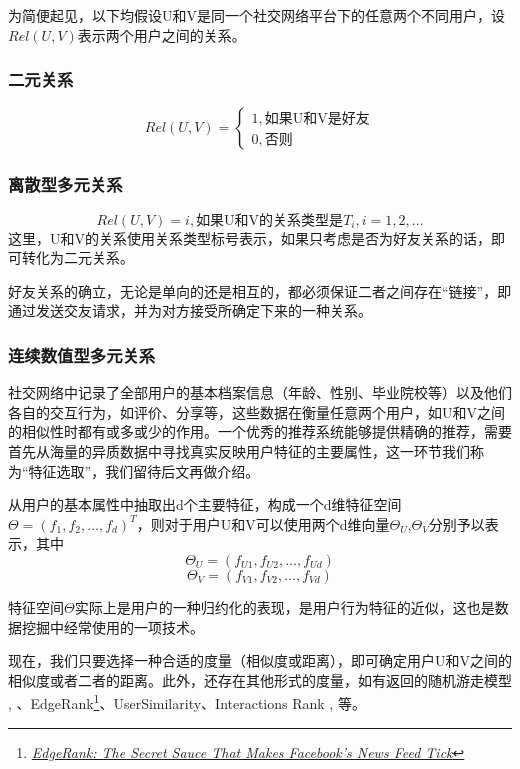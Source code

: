 为简便起见，以下均假设U和V是同一个社交网络平台下的任意两个不同用户，设$Rel(U,V)$表示两个用户之间的关系。

\subsubsection{二元关系}
\begin{equation}\label{eq:bi-relation}
Rel(U,V) = \left\{
    \begin{array}{l}
        1, \text{如果U和V是好友}\\
        0, \text{否则}
    \end{array}
    \right.
\end{equation}

\subsubsection{离散型多元关系}
\begin{equation}\label{eq:multidis-relation}
Rel(U,V)=i,\text{如果U和V的关系类型是}T_i,i=1,2,\dots
\end{equation}
这里，U和V的关系使用关系类型标号表示，如果只考虑是否为好友关系的话，即可转化为二元关系。

好友关系的确立，无论是单向的还是相互的，都必须保证二者之间存在“链接”，即通过发送交友请求，并为对方接受所确定下来的一种关系。

\subsubsection{连续数值型多元关系}
社交网络中记录了全部用户的基本档案信息（年龄、性别、毕业院校等）以及他们各自的交互行为，如评价、分享等，这些数据在衡量任意两个用户，如U和V之间的相似性时都有或多或少的作用。一个优秀的推荐系统能够提供精确的推荐，需要首先从海量的异质数据中寻找真实反映用户特征的主要属性，这一环节我们称为“特征选取”，我们留待后文再做介绍。

从用户的基本属性中抽取出d个主要特征，构成一个d维特征空间$\Theta=(f_1,f_2,\ldots,f_d )^T$，则对于用户U和V可以使用两个d维向量$\Theta_U$,$\Theta_V$分别予以表示，其中
\[\Theta_U=(f_{U1},f_{U2},\ldots,f_{Ud})\]
\[\Theta_V=(f_{V1},f_{V2},\ldots,f_{Vd})\]

特征空间$\Theta$实际上是用户的一种归约化的表现，是用户行为特征的近似，这也是数据挖掘中经常使用的一项技术。

现在，我们只要选择一种合适的度量（相似度或距离），即可确定用户U和V之间的相似度或者二者的距离。此外，还存在其他形式的度量，如有返回的随机游走模型
\cite{tong2008random,fujiwara2012fast}, 、EdgeRank\footnote{\href{http://techcrunch.com/2010/04/22/facebook-edgerank/}{\textit{EdgeRank: The Secret Sauce That Makes Facebook's News Feed Tick}}}、UserSimilarity\cite{gretarsson2010smallworlds}、Interactions Rank\cite{roth2010suggesting} , 等。

